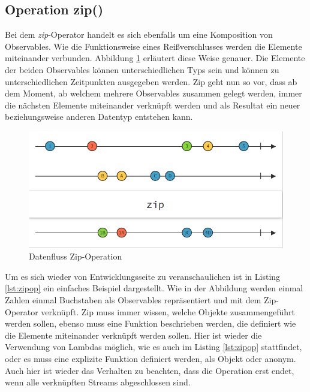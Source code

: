 \subsection{Operation zip()}
Bei dem \textit{zip}-Operator handelt es sich ebenfalls um eine Komposition von Observables. Wie die Funktionsweise eines Reißverschlusses werden die Elemente miteinander verbunden. Abbildung \ref{pic:zipop} erläutert diese Weise genauer. Die Elemente der beiden Observables können unterschiedlichen Typs sein und können zu unterschiedlichen Zeitpunkten ausgegeben werden. Zip geht nun so vor, dass ab dem Moment, ab welchem mehrere Observables zusammen gelegt werden, immer die nächsten Elemente miteinander verknüpft werden und als Resultat ein neuer beziehungsweise anderen Datentyp entstehen kann.
\begin{figure}
	\centering
	\includegraphics[width=1\textwidth]{Abb/zip}
	\caption{Datenfluss Zip-Operation}
	\label{pic:zipop}
\end{figure}
 
Um es sich wieder von Entwicklungsseite zu veranschaulichen ist in Listing \ref{lst:zipop} ein einfaches Beispiel dargestellt. Wie in der Abbildung werden einmal Zahlen einmal Buchstaben als Observables repräsentiert und mit dem Zip-Operator verknüpft. Zip muss immer wissen, welche Objekte zusammengeführt werden sollen, ebenso muss eine Funktion beschrieben werden, die definiert wie die Elemente miteinander verknüpft werden sollen. Hier ist wieder die Verwendung von Lambdas möglich, wie es auch im Listing \ref{lst:zipop} stattfindet, oder es muss eine explizite Funktion definiert werden, als Objekt oder anonym. Auch hier ist wieder das Verhalten zu beachten, dass die Operation erst endet, wenn alle verknüpften Streams abgeschlossen sind. 